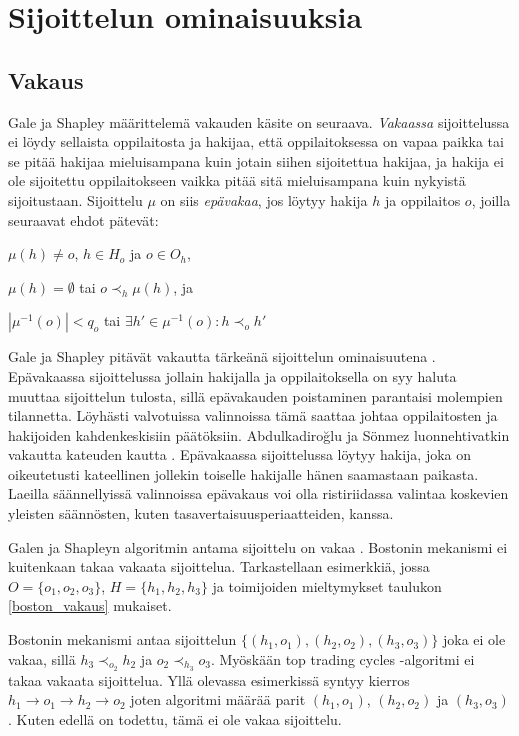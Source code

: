 \documentclass[twoside]{tktltiki}
\begin{document}
\section{Sijoittelun ominaisuuksia}
\label{ominaisuus_luku}
\subsection{Vakaus}

Gale ja Shapley määrittelemä vakauden käsite \cite{galeshapley62} on
seuraava. \emph{Vakaassa} sijoittelussa ei löydy sellaista
oppilaitosta ja hakijaa, että oppilaitoksessa on vapaa paikka tai se
pitää hakijaa mieluisampana kuin jotain siihen sijoitettua hakijaa, ja
hakija ei ole sijoitettu oppilaitokseen vaikka pitää sitä
mieluisampana kuin nykyistä sijoitustaan. Sijoittelu $\mu$ on siis
\emph{epävakaa}, jos löytyy hakija $h$ ja oppilaitos $o$, joilla
seuraavat ehdot pätevät:

\begin{itemize*}
  \item $\mu(h) \neq o$, $h \in H_o$ ja $o \in O_h$,
  \item $\mu(h) = \emptyset$ tai $o \prec_h \mu(h)$, ja
  \item $|\mu^{-1}(o)| < q_o$ tai $\exists h' \in \mu^{-1}(o): h
    \prec_o h'$
\end{itemize*}

Gale ja Shapley pitävät vakautta tärkeänä sijoittelun ominaisuutena
\cite{galeshapley62}. Epävakaassa sijoittelussa jollain hakijalla ja
oppilaitoksella on syy haluta muuttaa sijoittelun tulosta, sillä
epävakauden poistaminen parantaisi molempien tilannetta. Löyhästi
valvotuissa valinnoissa tämä saattaa johtaa oppilaitosten ja
hakijoiden kahdenkeskisiin päätöksiin. Abdulkadiroğlu ja Sönmez
luonnehtivatkin vakautta kateuden kautta \cite{abduson03}. Epävakaassa
sijoittelussa löytyy hakija, joka on oikeutetusti kateellinen jollekin
toiselle hakijalle hänen saamastaan paikasta. Laeilla säännellyissä
valinnoissa epävakaus voi olla ristiriidassa valintaa koskevien
yleisten säännösten, kuten tasavertaisuusperiaatteiden, kanssa.

Galen ja Shapleyn algoritmin antama sijoittelu on vakaa
\cite{galeshapley62, gusfield89}. Bostonin mekanismi ei kuitenkaan
takaa vakaata sijoittelua. Tarkastellaan esimerkkiä, jossa $O = \{o_1,
o_2, o_3\}$, $H = \{h_1, h_2, h_3\}$ ja toimijoiden mieltymykset
taulukon \ref{boston_vakaus} mukaiset.

Bostonin mekanismi antaa sijoittelun $\{(h_1, o_1), (h_2, o_2), (h_3,
o_3)\}$ joka ei ole vakaa, sillä $h_3 \prec_{o_2} h_2$ ja $o_2
\prec_{h_3} o_3$. Myöskään top trading cycles -algoritmi ei takaa
vakaata sijoittelua. Yllä olevassa esimerkissä syntyy kierros $h_1
\rightarrow o_1 \rightarrow h_2 \rightarrow o_2$ joten algoritmi
määrää parit $(h_1, o_1)$, $(h_2, o_2)$ ja $(h_3, o_3)$. Kuten edellä
on todettu, tämä ei ole vakaa sijoittelu.
\end{document}
